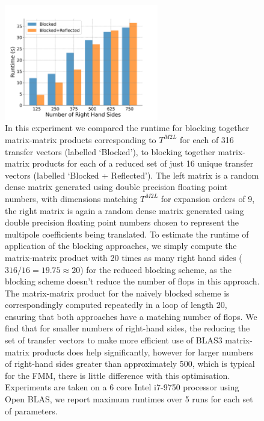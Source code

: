\begin{figure}
    \centering
    \includegraphics[width=0.6\textwidth]{images/ch_3/blas3.png}
    \caption{In this experiment we compared the runtime for blocking together matrix-matrix products corresponding to $T^{M2L}$ for each of 316 transfer vectors (labelled `Blocked'), to blocking together matrix-matrix products for each of a reduced set of just 16 unique transfer vectors (labelled `Blocked + Reflected'). The left matrix is a random dense matrix generated using double precision floating point numbers, with dimensions matching $T^{M2L}$ for expansion orders of 9, the right matrix is again a random dense matrix generated using double precision floating point numbers chosen to represent the multipole coefficients being translated. To estimate the runtime of application of the blocking approaches, we simply compute the matrix-matrix product with 20 times as many right hand sides ($316/16 = 19.75 \approx 20$) for the reduced blocking scheme, as the blocking scheme doesn't reduce the number of flops in this approach. The matrix-matrix product for the naively blocked scheme is correspondingly computed repeatedly in a loop of length 20, ensuring that both approaches have a matching number of flops. We find that for smaller numbers of right-hand sides, the reducing the set of transfer vectors to make more efficient use of BLAS3 matrix-matrix products does help significantly, however for larger numbers of right-hand sides greater than approximately 500, which is typical for the FMM, there is little difference with this optimisation. Experiments are taken on a 6 core Intel i7-9750 processor using Open BLAS, we report maximum runtimes over 5 runs for each set of parameters.}
    \label{fig:chpt:3:sec:1:subsec:2:blas3}
\end{figure}

